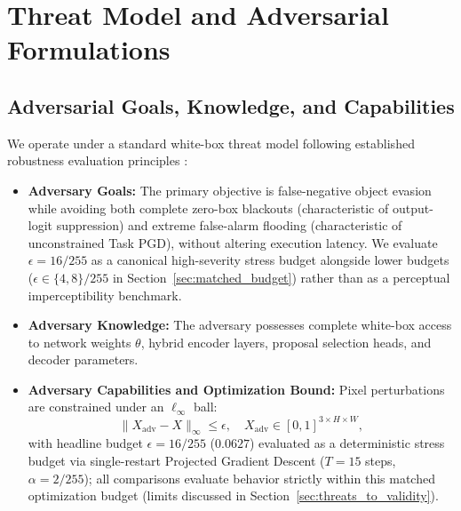 \documentclass[preprint,10pt]{elsarticle}
\begin{document}

\section{Threat Model and Adversarial Formulations}
\label{sec:threat_model}

\subsection{Adversarial Goals, Knowledge, and Capabilities}
We operate under a standard white-box threat model following established robustness evaluation principles \citep{carlini2019evaluating}:
\begin{itemize}
    \item \textbf{Adversary Goals:} The primary objective is false-negative object evasion while avoiding both complete zero-box blackouts (characteristic of output-logit suppression) and extreme false-alarm flooding (characteristic of unconstrained Task PGD), without altering execution latency. We evaluate $\epsilon = 16/255$ as a canonical high-severity stress budget alongside lower budgets ($\epsilon \in \{4, 8\}/255$ in Section~\ref{sec:matched_budget}) rather than as a perceptual imperceptibility benchmark.
    \item \textbf{Adversary Knowledge:} The adversary possesses complete white-box access to network weights $\theta$, hybrid encoder layers, proposal selection heads, and decoder parameters.
    \item \textbf{Adversary Capabilities and Optimization Bound:} Pixel perturbations are constrained under an $\ell_\infty$ ball:
    \begin{equation}
    \| X_{\mathrm{adv}} - X \|_\infty \le \epsilon, \quad X_{\mathrm{adv}} \in [0, 1]^{3 \times H \times W},
    \end{equation}
    with headline budget $\epsilon = 16/255$ ($0.0627$) evaluated as a deterministic stress budget via single-restart Projected Gradient Descent ($T = 15$ steps, $\alpha = 2/255$); all comparisons evaluate behavior strictly within this matched optimization budget (limits discussed in Section~\ref{sec:threats_to_validity}).
\end{itemize}
\end{document}
